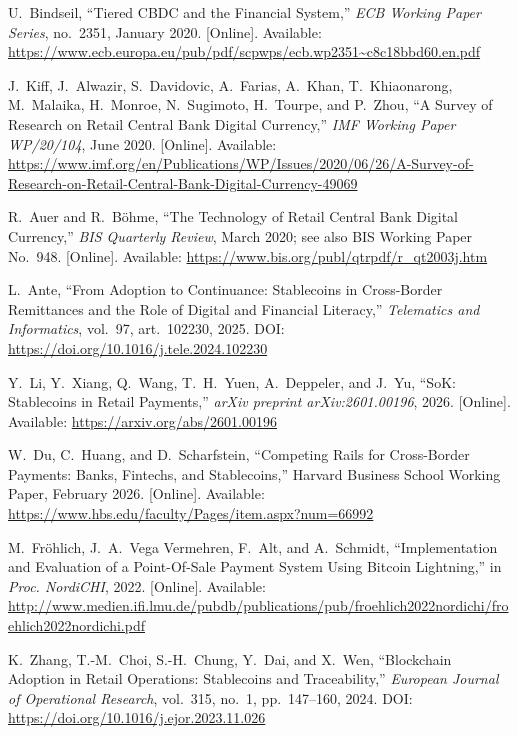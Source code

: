 \documentclass[12pt,a4paper]{report}
\begin{document}
{\begin{enumerate}[label={[\arabic*]}]
\item U.~Bindseil, ``Tiered CBDC and the Financial System,'' \textit{ECB Working Paper Series}, no.~2351, January 2020. [Online]. Available: \url{https://www.ecb.europa.eu/pub/pdf/scpwps/ecb.wp2351~c8c18bbd60.en.pdf}

\item J.~Kiff, J.~Alwazir, S.~Davidovic, A.~Farias, A.~Khan, T.~Khiaonarong, M.~Malaika, H.~Monroe, N.~Sugimoto, H.~Tourpe, and P.~Zhou, ``A Survey of Research on Retail Central Bank Digital Currency,'' \textit{IMF Working Paper WP/20/104}, June 2020. [Online]. Available: \url{https://www.imf.org/en/Publications/WP/Issues/2020/06/26/A-Survey-of-Research-on-Retail-Central-Bank-Digital-Currency-49069}

\item R.~Auer and R.~B\"{o}hme, ``The Technology of Retail Central Bank Digital Currency,'' \textit{BIS Quarterly Review}, March 2020; see also BIS Working Paper No.~948. [Online]. Available: \url{https://www.bis.org/publ/qtrpdf/r_qt2003j.htm}

\item L.~Ante, ``From Adoption to Continuance: Stablecoins in Cross-Border Remittances and the Role of Digital and Financial Literacy,'' \textit{Telematics and Informatics}, vol.~97, art.~102230, 2025. DOI: \url{https://doi.org/10.1016/j.tele.2024.102230}

\item Y.~Li, Y.~Xiang, Q.~Wang, T.~H.~Yuen, A.~Deppeler, and J.~Yu, ``SoK: Stablecoins in Retail Payments,'' \textit{arXiv preprint arXiv:2601.00196}, 2026. [Online]. Available: \url{https://arxiv.org/abs/2601.00196}

\item W.~Du, C.~Huang, and D.~Scharfstein, ``Competing Rails for Cross-Border Payments: Banks, Fintechs, and Stablecoins,'' Harvard Business School Working Paper, February 2026. [Online]. Available: \url{https://www.hbs.edu/faculty/Pages/item.aspx?num=66992}

\item M.~Fr\"{o}hlich, J.~A.~Vega Vermehren, F.~Alt, and A.~Schmidt, ``Implementation and Evaluation of a Point-Of-Sale Payment System Using Bitcoin Lightning,'' in \textit{Proc. NordiCHI}, 2022. [Online]. Available: \url{http://www.medien.ifi.lmu.de/pubdb/publications/pub/froehlich2022nordichi/froehlich2022nordichi.pdf}

\item K.~Zhang, T.-M.~Choi, S.-H.~Chung, Y.~Dai, and X.~Wen, ``Blockchain Adoption in Retail Operations: Stablecoins and Traceability,'' \textit{European Journal of Operational Research}, vol.~315, no.~1, pp.~147--160, 2024. DOI: \url{https://doi.org/10.1016/j.ejor.2023.11.026}


\end{enumerate}}
\end{document}
